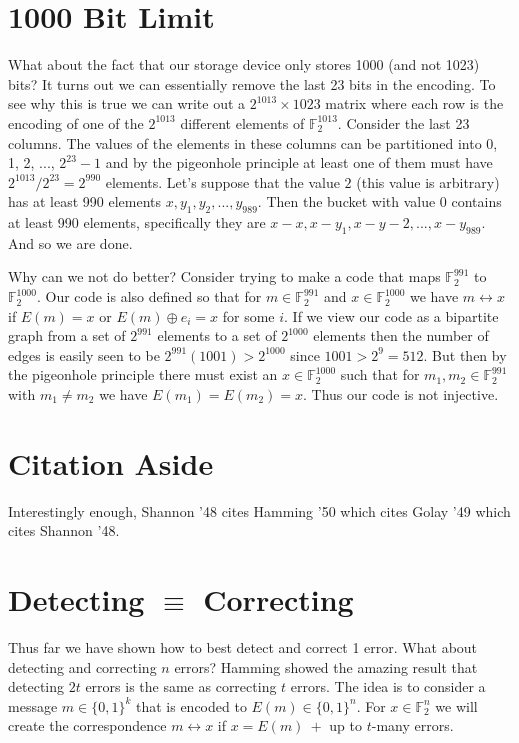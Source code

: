 \documentclass[10pt]{article}
\begin{document}
\section{1000 Bit Limit}
What about the fact that our storage device only stores 1000 (and not 1023) bits? It turns out we can essentially remove the last 23 bits in the encoding. To see why this is true we can write out a $2^{1013} \times 1023$ matrix where each row is the encoding of one of the $2^{1013}$ different elements of $\mathbb F_2^{1013}.$ Consider the last 23 columns. The values of the elements in these columns can be partitioned into 0, 1, 2, ..., $2^{23}-1$ and by the pigeonhole principle at least one of them must have $2^{1013} / 2^{23} = 2^{990}$ elements. Let's suppose that the value $2$ (this value is arbitrary) has at least 990 elements $x, y_1, y_2, ..., y_{989}.$ Then the bucket with value 0 contains at least 990 elements, specifically they are $x-x, x-y_1, x-y-2, ..., x-y_{989}.$ And so we are done.

Why can we not do better? Consider trying to make a code that maps $\mathbb F_2^{991}$ to $\mathbb F_2^{1000}$. Our code is also defined so that for $m \in \mathbb F_2^{991}$ and $x \in \mathbb F_2^{1000}$ we have $m \leftrightarrow x$ if $E(m) = x$ or $E(m) \oplus e_i = x$ for some $i.$ If we view our code as a bipartite graph from a set of $2^{991}$ elements to a set of $2^{1000}$ elements then the number of edges is easily seen to be $2^{991}(1001) > 2^{1000}$ since $1001 > 2^9 = 512.$ But then by the pigeonhole principle there must exist an $x \in \mathbb F_2^{1000}$ such that for $m_1, m_2 \in \mathbb F_2^{991}$ with $m_1 \neq m_2$ we have $E(m_1) = E(m_2) = x.$ Thus our code is not injective.

\section{Citation Aside}
Interestingly enough, Shannon '48 cites Hamming '50 which cites Golay '49 which cites Shannon '48.

\section{Detecting $\equiv$ Correcting}
Thus far we have shown how to best detect and correct 1 error. What about detecting and correcting $n$ errors? Hamming showed the amazing result that detecting $2t$ errors is the same as correcting $t$ errors. The idea is to consider a message $m\in\{0, 1\}^k$ that is encoded to $E(m) \in \{0, 1\}^n.$ For $x \in \mathbb F_2^n$ we will create the correspondence $m \leftrightarrow x$ if $x = E(m) \ +$ up to $t$-many errors.
\end{document}
